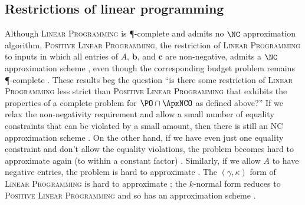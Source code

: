 \subsection{Restrictions of linear programming}

Although \textsc{Linear Programming} is \P-complete and admits no $\NC$ approximation algorithm, \textsc{Positive Linear Programming}, the restriction of \textsc{Linear Programming} to inputs in which all entries of $A$, $\mathbf{b}$, and $\mathbf{c}$ are non-negative, admits a $\NC$ approximation scheme \cite{ln93}, even though the corresponding budget problem remains \P-complete \cite[Theorem~4]{tx98}.
These results beg the question ``is there some restriction of \textsc{Linear Programming} less strict than \textsc{Positive Linear Programming} that exhibits the properties of a complete problem for $\PO \cap \ApxNCO$ as defined above?''
If we relax the non-negativity requirement and allow a small number of equality constraints that can be violated by a small amount, then there is still an NC approximation scheme \cite[Theorem~5.2]{tx98}.
On the other hand, if we have even just one equality constraint and don't allow the equality violations, the problem becomes hard to approximate again (to within a constant factor) \cite[Theorem~3.1]{es99} \cite[Remark~2]{tx98}.
Similarly, if we allow $A$ to have negative entries, the problem is hard to approximate \cite[Corollary~2]{efraimidis08}.
The $(\gamma, \kappa)$ form of \textsc{Linear Programming} is hard to approximate \cite[Proposition~1]{efraimidis08}; the $k$-normal form reduces to \textsc{Positive Linear Programming} and so has an approximation scheme \cite[Theorem~2]{trevisan00}.


